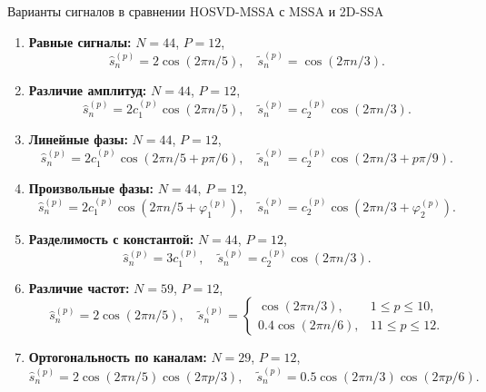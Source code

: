 \documentclass[pdf, unicode, 9pt, notheorems, handout]{beamer}
\begin{document}
\begin{frame}[noframenumbering]{Варианты сигналов в сравнении
  HOSVD-MSSA с MSSA и 2D-SSA}
  \begin{enumerate}
    \item \textbf{Равные сигналы:} $N = 44$, $P = 12$,
      \[
        \hat{s}_n^{(p)} = 2 \cos(2 \pi n / 5), \quad
        \tilde{s}_n^{(p)} = \cos(2\pi n /3).
      \]
    \item \textbf{Различие амплитуд:} $N = 44$, $P = 12$,
      \[
        \hat{s}_n^{(p)} = 2 c_1^{(p)} \cos(2 \pi n / 5), \quad
        \tilde{s}_n^{(p)} = c_2^{(p)}\cos(2\pi n /3).
      \]
    \item \textbf{Линейные фазы:} $N = 44$, $P = 12$,
      \[
        \hat{s}_n^{(p)} = 2 c_1^{(p)} \cos(2 \pi n / 5 + p \pi / 6),
        \quad \tilde{s}_n^{(p)} = c_2^{(p)}\cos(2\pi n /3 + p \pi / 9).
      \]
    \item \textbf{Произвольные фазы:} $N = 44$, $P = 12$,
      \[
        \hat{s}_n^{(p)} = 2 c_1^{(p)} \cos(2 \pi n / 5 + \varphi_1^{(p)}),
        \quad \tilde{s}_n^{(p)} = c_2^{(p)}\cos(2\pi n /3 + \varphi_2^{(p)}).
      \]
    \item \textbf{Разделимость с константой:} $N = 44$, $P = 12$,
      \[
        \hat{s}_n^{(p)} = 3 c_1^{(p)},
        \quad \tilde{s}_n^{(p)} = c_2^{(p)}\cos(2\pi n /3).
      \]
    \item \textbf{Различие частот:} $N = 59$, $P = 12$,
      \[
        \hat{s}_n^{(p)} = 2 \cos(2 \pi n / 5), \quad
        \tilde{s}_n^{(p)} =
        \begin{cases}
          \cos(2\pi n /3), & 1 \leqslant p \leqslant 10,\\
          0.4 \cos(2 \pi n / 6), & 11 \leqslant p \leqslant 12.
        \end{cases}
      \]
    \item \textbf{Ортогональность по каналам:} $N = 29$, $P = 12$,
      \[
        \hat{s}_n^{(p)} = 2 \cos(2 \pi n / 5) \cos(2 \pi p / 3), \quad
        \tilde{s}_n^{(p)} = 0.5 \cos(2\pi n /3) \cos(2 \pi p / 6).
      \]
  \end{enumerate}
\end{frame}
\end{document}
